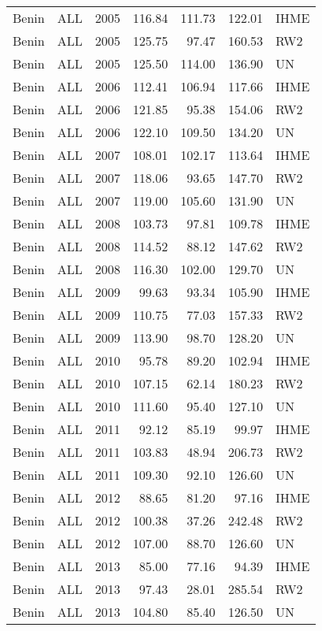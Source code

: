 \begin{longtable}{lllrrrl}
  Benin & ALL & 2005 & 116.84 & 111.73 & 122.01 & IHME \\ 
  Benin & ALL & 2005 & 125.75 & 97.47 & 160.53 & RW2 \\ 
  Benin & ALL & 2005 & 125.50 & 114.00 & 136.90 & UN \\ 
  Benin & ALL & 2006 & 112.41 & 106.94 & 117.66 & IHME \\ 
  Benin & ALL & 2006 & 121.85 & 95.38 & 154.06 & RW2 \\ 
  Benin & ALL & 2006 & 122.10 & 109.50 & 134.20 & UN \\ 
  Benin & ALL & 2007 & 108.01 & 102.17 & 113.64 & IHME \\ 
  Benin & ALL & 2007 & 118.06 & 93.65 & 147.70 & RW2 \\ 
  Benin & ALL & 2007 & 119.00 & 105.60 & 131.90 & UN \\ 
  Benin & ALL & 2008 & 103.73 & 97.81 & 109.78 & IHME \\ 
  Benin & ALL & 2008 & 114.52 & 88.12 & 147.62 & RW2 \\ 
  Benin & ALL & 2008 & 116.30 & 102.00 & 129.70 & UN \\ 
  Benin & ALL & 2009 & 99.63 & 93.34 & 105.90 & IHME \\ 
  Benin & ALL & 2009 & 110.75 & 77.03 & 157.33 & RW2 \\ 
  Benin & ALL & 2009 & 113.90 & 98.70 & 128.20 & UN \\ 
  Benin & ALL & 2010 & 95.78 & 89.20 & 102.94 & IHME \\ 
  Benin & ALL & 2010 & 107.15 & 62.14 & 180.23 & RW2 \\ 
  Benin & ALL & 2010 & 111.60 & 95.40 & 127.10 & UN \\ 
  Benin & ALL & 2011 & 92.12 & 85.19 & 99.97 & IHME \\ 
  Benin & ALL & 2011 & 103.83 & 48.94 & 206.73 & RW2 \\ 
  Benin & ALL & 2011 & 109.30 & 92.10 & 126.60 & UN \\ 
  Benin & ALL & 2012 & 88.65 & 81.20 & 97.16 & IHME \\ 
  Benin & ALL & 2012 & 100.38 & 37.26 & 242.48 & RW2 \\ 
  Benin & ALL & 2012 & 107.00 & 88.70 & 126.60 & UN \\ 
  Benin & ALL & 2013 & 85.00 & 77.16 & 94.39 & IHME \\ 
  Benin & ALL & 2013 & 97.43 & 28.01 & 285.54 & RW2 \\ 
  Benin & ALL & 2013 & 104.80 & 85.40 & 126.50 & UN \\ 

\end{longtable}
